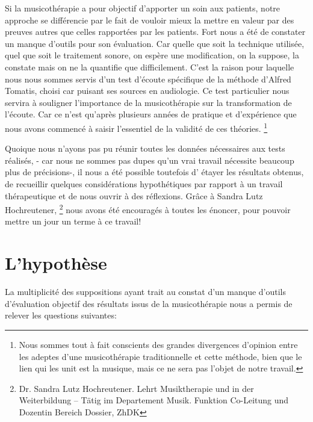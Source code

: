  



Si la musicothérapie a pour objectif d'apporter un soin aux patients, notre  approche se différencie par le fait de
vouloir mieux la mettre en valeur par des preuves
autres que celles rapportées par les patients. Fort nous a été de
constater un manque d'outils pour son évaluation. Car quelle que soit la technique utilisée, quel que soit
le traitement sonore, on espère une modification, on la suppose, la constate
 mais
 on ne la quantifie que difficilement. C'est la raison pour laquelle
 nous nous sommes servis d'un test d'écoute
 spécifique de la méthode d'Alfred Tomatis, choisi car puisant ses
 sources en audiologie.
 Ce test particulier  nous servira à
 souligner l'importance de la musicothérapie 
 sur la transformation de l'écoute.
 Car ce n'est qu'après plusieurs
années de pratique et d'expérience que nous avons commencé à saisir
l'essentiel de la validité de ces théories.
\footnote{Nous sommes tout à fait conscients des
 grandes divergences d'opinion entre les adeptes d'une musicothérapie
 traditionnelle et cette méthode, bien que le lien qui les unit est
 la musique, mais ce ne sera pas l'objet de notre travail.}

Quoique nous n'ayons pas pu réunir toutes les données nécessaires
aux tests réalisés, - car nous ne sommes pas dupes qu'un vrai travail
nécessite beaucoup plus de précisions-, il nous a été possible toutefois d' étayer
les résultats obtenus, de recueillir quelques considérations hypothétiques par rapport à un
travail thérapeutique et de nous ouvrir à des réflexions. 
Grâce à Sandra Lutz Hochreutener,  \footnote{Dr. Sandra Lutz
  Hochreutener. Lehrt Musiktherapie und in der Weiterbildung – Tätig
  im Departement Musik. Funktion Co-Leitung und Dozentin Bereich
  Dossier, ZhDK}
 nous avons été encouragés à toutes les énoncer, pour pouvoir mettre un jour un terme à ce travail!


 

  


\section {L'hypothèse}


   La    multiplicité des suppositions ayant trait au constat d'un manque
   d'outils d'évaluation objectif des résultats issus de la
   musicothérapie  nous a  permis de relever les questions
   suivantes:  



